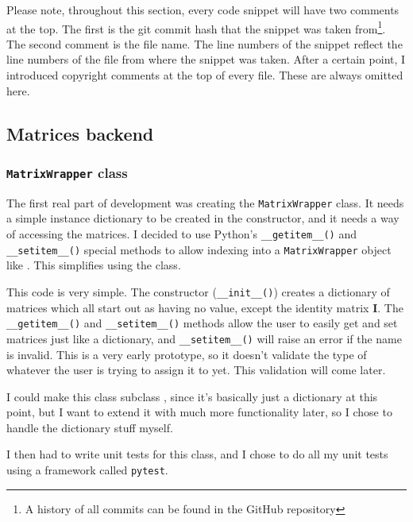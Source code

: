 \documentclass[../main.tex]{subfiles}
\begin{document}
Please note, throughout this section, every code snippet will have two comments at the top. The first is the git commit hash that the snippet was taken from\footnote{A history of all commits can be found in the GitHub repository\cite{lintrans-github}}. The second comment is the file name. The line numbers of the snippet reflect the line numbers of the file from where the snippet was taken. After a certain point, I introduced copyright comments at the top of every file. These are always omitted here.

\subsection{Matrices backend\label{development:matrices-backend}}

\subsubsection{\texttt{MatrixWrapper} class\label{development:matrices-backend:MatrixWrapper-class}}

The first real part of development was creating the \texttt{MatrixWrapper} class. It needs a simple instance dictionary to be created in the constructor, and it needs a way of accessing the matrices. I decided to use Python's \texttt{\_\_getitem\_\_()} and \texttt{\_\_setitem\_\_()} special methods\cite{python-3-special-methods} to allow indexing into a \texttt{MatrixWrapper} object like . This simplifies using the class.


This code is very simple. The constructor (\texttt{\_\_init\_\_()}) creates a dictionary of matrices which all start out as having no value, except the identity matrix \textbf{I}. The \texttt{\_\_getitem\_\_()} and \texttt{\_\_setitem\_\_()} methods allow the user to easily get and set matrices just like a dictionary, and \texttt{\_\_setitem\_\_()} will raise an error if the name is invalid. This is a very early prototype, so it doesn't validate the type of whatever the user is trying to assign it to yet. This validation will come later.

I could make this class subclass , since it's basically just a dictionary at this point, but I want to extend it with much more functionality later, so I chose to handle the dictionary stuff myself.

I then had to write unit tests for this class, and I chose to do all my unit tests using a framework called \texttt{pytest}.
\end{document}
